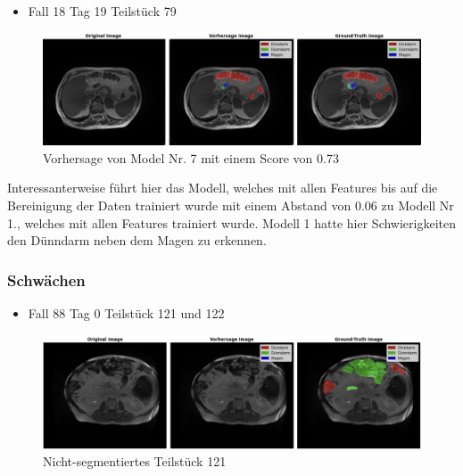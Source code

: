 \begin{itemize}
\item Fall 18 Tag 19 Teilstück 79
\end{itemize}

\begin{figure}[H]
	\begin{center}
		\includegraphics[width=400pt]{LaTex/bilder/case18_day19_slice_0079.png}
		\caption{ Vorhersage von Model Nr. 7 mit einem Score von 0.73 }\label{Fig:trade-off}
	\end{center}
\end{figure}

Interessanterweise führt hier das Modell, welches mit allen Features bis auf die Bereinigung der Daten trainiert wurde mit einem Abstand von 0.06 zu Modell Nr 1., welches mit allen Features trainiert wurde. Modell 1 hatte hier Schwierigkeiten den Dünndarm neben dem Magen zu erkennen. 

\pagebreak

\subsubsection{Schwächen}

\begin{itemize}
\item  Fall 88 Tag 0 Teilstück 121 und 122
\end{itemize}

\begin{figure}[H]
	\begin{center}
		\includegraphics[width=400pt]{LaTex/bilder/case88_day0_slice_0121.png}
		\caption{ Nicht-segmentiertes Teilstück 121 }\label{Fig:7vs1}
	\end{center}
\end{figure}

